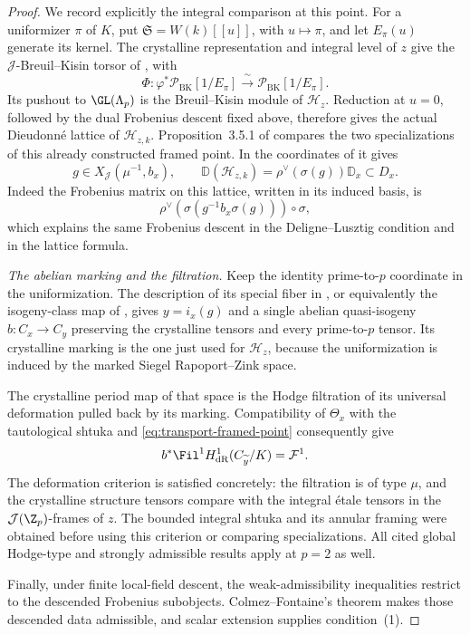 \begin{proof}
We record explicitly the integral comparison at this point.
For a uniformizer $\pi$ of $K$, put
$\mathfrak S=W(k)[[u]]$, with $u\mapsto\pi$, and let
$E_\pi(u)$ generate its kernel.  The crystalline representation
and integral level of $z$ give the $\mathcal J$-Breuil--Kisin
torsor of \cite[\S3.5]{PappasRapoport2024}, with
\[
 \Phi:\varphi^*\mathcal P_{\mathrm{BK}}[1/E_\pi]
             \xrightarrow{\ \sim\ }
             \mathcal P_{\mathrm{BK}}[1/E_\pi].
\]
Its pushout to $\GL(\Lambda_p)$ is the Breuil--Kisin module of
$\mathcal H_z$.  Reduction at $u=0$, followed by the dual
Frobenius descent fixed above, therefore gives the actual
Dieudonn\'e lattice of $\mathcal H_{z,k}$.
Proposition~3.5.1 of \cite{PappasRapoport2024} compares the two
specializations of this already constructed framed point.  In
the coordinates of \cite[Theorem~2.2.5]{KisinZhou2025} it gives
\[
 g\in X_{\mathcal J}(\mu^{-1},b_x),\qquad
 \mathbb D(\mathcal H_{z,k})
       =\rho^\vee(\sigma(g))\mathbb D_x\subset D_x.
\]
Indeed the Frobenius matrix on this lattice, written in its
induced basis, is
\[
 \rho^\vee\!\left(
       \sigma(g^{-1}b_x\sigma(g))\right)\circ\sigma,
\]
which explains the same Frobenius descent in the
Deligne--Lusztig condition and in the lattice formula.

\medskip\noindent
\emph{The abelian marking and the filtration.}
Keep the identity prime-to-$p$ coordinate in the uniformization.
The description of its special fiber in
\cite[\S4.10.3]{PappasRapoport2024}, or equivalently the
isogeny-class map of \cite[Theorem~2.2.5]{KisinZhou2025}, gives
$y=i_x(g)$ and a single abelian quasi-isogeny
$b:C_x\to C_y$ preserving the crystalline tensors and every
prime-to-$p$ tensor.  Its crystalline marking is the one just
used for $\mathcal H_z$, because the uniformization is induced
by the marked Siegel Rapoport--Zink space.

The crystalline period map of that space is the Hodge filtration
of its universal deformation pulled back by its marking.
Compatibility of $\Theta_x$ with the tautological shtuka and
\eqref{eq:transport-framed-point} consequently give
\[
 b^*\Fil^1H^1_{\mathrm{dR}}(C_{\widetilde y}/K)
       =\mathcal F^1.
\]
The deformation criterion
\cite[Proposition~2.2.3]{KisinZhou2025} is satisfied concretely:
the filtration is of type $\mu$, and the crystalline structure
tensors compare with the integral \'{e}tale tensors in the
$\mathcal J(\Z_p)$-frames of $z$.  The bounded integral shtuka
and its annular framing were obtained before using this
criterion or comparing specializations.  All cited global
Hodge-type and strongly admissible results apply at $p=2$ as
well.

Finally, under finite local-field descent, the weak-admissibility
inequalities restrict to the descended Frobenius subobjects.
Colmez--Fontaine's theorem
\cite[Theorem~A]{ColmezFontaine2000} makes those descended data
admissible, and scalar extension supplies condition~\textup{(1)}.
\end{proof}

